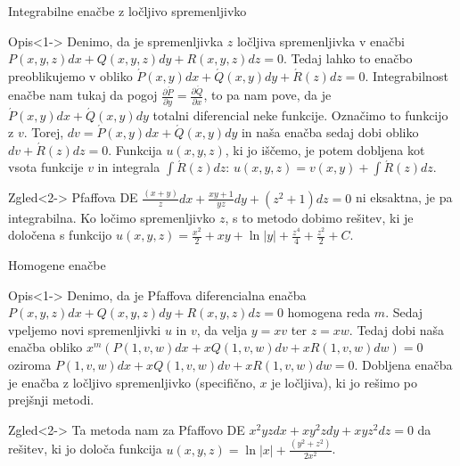 \documentclass[t, 10pt]{beamer} %
\newcommand{\abs}[1]{\ensuremath{\lvert #1 \rvert}}
\newcommand{\fillblack}[1]{
	\begin{tikzpicture}[remember picture, overlay]
		\node [shift={(0 cm,0cm)}]  at (current page.south west)
		{%
			\begin{tikzpicture}[remember picture, overlay] at (current page.south west)
				\draw [fill=black] (0, 0) -- (0,#1 \paperheight) --
				(\paperwidth,#1 \paperheight) -- (\paperwidth,0) -- cycle ;
			\end{tikzpicture}
		};
		\draw (current page.north west) rectangle (current page.south east);
	\end{tikzpicture}
}
\begin{document}
		\begin{frame}{Integrabilne enačbe z ločljivo spremenljivko}
			\begin{block}{Opis}<1->
				Denimo, da je spremenljivka $z$ ločljiva spremenljivka v enačbi $P(x, y, z)dx + Q(x, y, z)dy + R(x, y, z)dz = 0$. Tedaj lahko to enačbo preoblikujemo v obliko $\acute{P}(x, y)dx + \acute{Q}(x, y)dy + \acute{R}(z)dz = 0$. Integrabilnost enačbe nam tukaj da pogoj $\frac{\partial \acute{P}}{\partial y} = \frac{\partial \acute{Q}}{\partial x}$, to pa nam pove, da je $\acute{P}(x, y)dx + \acute{Q}(x, y)dy$ totalni diferencial neke funkcije. Označimo to funkcijo z $v$. Torej, $dv = \acute{P}(x, y)dx + \acute{Q}(x, y)dy$ in naša enačba sedaj dobi obliko $dv + \acute{R}(z)dz = 0$. Funkcija $u(x, y, z)$, ki jo iščemo, je potem dobljena kot vsota funkcije $v$ in integrala $\int \acute{R}(z)dz$: $u(x, y, z) = v(x, y) + \int \acute{R}(z)dz$.
			\end{block}
			\begin{block}{Zgled}<2->
				Pfaffova DE $\frac{(x+y)}{z}dx + \frac{xy+1}{yz}dy + (z^2 + 1)dz = 0$ ni eksaktna, je pa integrabilna. Ko ločimo spremenljivko $z$, s to metodo dobimo rešitev, ki je določena s funkcijo $u(x, y, z) = \frac{x^2}{2} + xy + \ln|y| + \frac{z^4}{4} + \frac{z^2}{2} + C$.
			\end{block}
		\end{frame}
		
		\begin{frame}{Homogene enačbe}
			\begin{block}{Opis}<1->
					Denimo, da je Pfaffova diferencialna enačba $P(x, y, z)dx + Q(x, y, z)dy + R(x, y, z)dz = 0$ homogena reda $m$. Sedaj vpeljemo novi spremenljivki $u$ in $v$, da velja $y = xv$ ter $z = xw$. Tedaj dobi naša enačba obliko $x^m(P(1, v, w)dx + xQ(1, v, w)dv + xR(1, v, w)dw) = 0$ oziroma $P(1, v, w)dx + xQ(1, v, w)dv + xR(1, v, w)dw = 0$. Dobljena enačba je enačba z ločljivo spremenljivko (specifično, $x$ je ločljiva), ki jo rešimo po prejšnji metodi.
			\end{block}
			\begin{block}{Zgled}<2->
				 Ta metoda nam za Pfaffovo DE $x^2yzdx + xy^2zdy + xyz^2dz = 0$ da rešitev, ki jo določa funkcija $u(x, y, z) = \ln\abs{x} + \frac{(y^2 + z^2)}{2x^2}$.
			\end{block}
		\end{frame}
		
\end{document}
